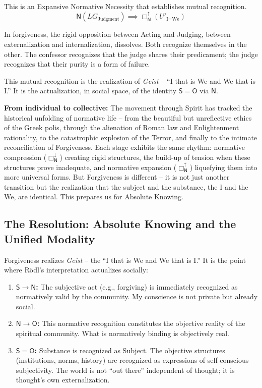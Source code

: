 \documentclass[12pt]{book}
\newcommand{\NBoxUp}{\Box_{\mathsf{N}}^{\uparrow}}
\begin{document}
\begin{enumerate}
This is an Expansive Normative Necessity that establishes mutual recognition.
\[
\mathsf{N}(LG_{\text{Judgment}}) \implies \NBoxUp(U'_{\text{I=We}})
\]

In forgiveness, the rigid opposition between Acting and Judging, between externalization and internalization, dissolves. Both recognize themselves in the other. The confessor recognizes that the judge shares their predicament; the judge recognizes that their purity is a form of failure.

This mutual recognition is the realization of \textit{Geist} -- ``I that is We and We that is I.'' It is the actualization, in social space, of the identity $\mathsf{S} = \mathsf{O}$ via $\mathsf{N}$.
\end{enumerate}

\textbf{From individual to collective:} The movement through Spirit has tracked the historical unfolding of normative life -- from the beautiful but unreflective ethics of the Greek polis, through the alienation of Roman law and Enlightenment rationality, to the catastrophic explosion of the Terror, and finally to the intimate reconciliation of Forgiveness. Each stage exhibits the same rhythm: normative compression ($\Box_{\mathsf{N}}^{\downarrow}$) creating rigid structures, the build-up of tension when these structures prove inadequate, and normative expansion ($\Box_{\mathsf{N}}^{\uparrow}$) liquefying them into more universal forms. But Forgiveness is different -- it is not just another transition but the realization that the subject and the substance, the I and the We, are identical. This prepares us for Absolute Knowing.

\subsection{The Resolution: Absolute Knowing and the Unified Modality}

Forgiveness realizes \textit{Geist} -- the ``I that is We and We that is I.'' It is the point where Rödl's interpretation actualizes socially:

\begin{enumerate}
\item \textbf{$\mathsf{S} \rightarrow \mathsf{N}$:} The subjective act (e.g., forgiving) is immediately recognized as normatively valid by the community. My conscience is not private but already social.

\item \textbf{$\mathsf{N} \rightarrow \mathsf{O}$:} This normative recognition constitutes the objective reality of the spiritual community. What is normatively binding is objectively real.

\item \textbf{$\mathsf{S} = \mathsf{O}$:} Substance is recognized as Subject. The objective structures (institutions, norms, history) are recognized as expressions of self-conscious subjectivity. The world is not ``out there'' independent of thought; it is thought's own externalization.
\end{enumerate}
\end{document}
